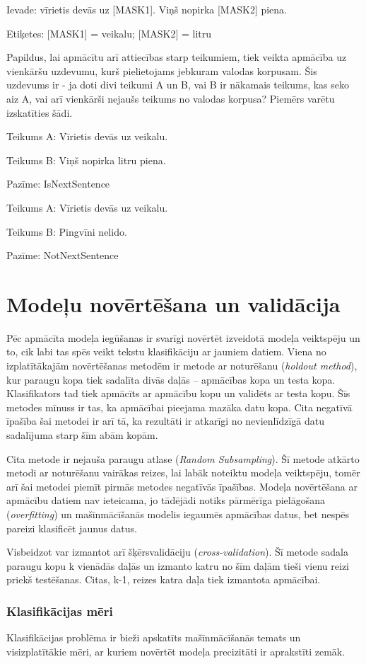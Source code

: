 Ievade: vīrietis devās uz [MASK1]. Viņš nopirka [MASK2] piena.

Etiķetes: [MASK1] = veikalu; [MASK2] = litru

Papildus, lai apmācītu arī attiecības starp teikumiem, tiek veikta apmācība uz vienkāršu uzdevumu, kurš pielietojams jebkuram valodas korpusam. Šis uzdevums ir - ja doti divi teikumi A un B, vai B ir nākamais teikums, kas seko aiz A, vai arī vienkārši nejaušs teikums no valodas korpusa? Piemērs varētu izskatīties šādi.

Teikums A: Vīrietis devās uz veikalu.

Teikums B: Viņš nopirka litru piena.

Pazīme: IsNextSentence

Teikums A: Vīrietis devās uz veikalu.

Teikums B: Pingvīni nelido.

Pazīme: NotNextSentence

\pagebreak
\section{Modeļu novērtēšana un validācija}
Pēc apmācīta modeļa iegūšanas ir svarīgi novērtēt izveidotā modeļa veiktspēju un to, cik labi tas spēs veikt tekstu klasifikāciju ar jauniem datiem. 
Viena no izplatītākajām novērtēšanas metodēm ir metode ar noturēšanu (\textit{holdout method}), kur paraugu kopa tiek sadalīta divās daļās – apmācības kopa un testa kopa. Klasifikators tad tiek apmācīts ar apmācību kopu un validēts ar testa kopu. Šīs metodes mīnuss ir tas, ka apmācībai pieejama mazāka datu kopa. Cita negatīvā īpašība šai metodei ir arī tā, ka rezultāti ir atkarīgi no nevienlīdzīgā datu sadalījuma starp šīm abām kopām.

Cita metode ir nejauša paraugu atlase (\textit{Random Subsampling}). Šī metode atkārto metodi ar noturēšanu vairākas reizes, lai labāk noteiktu modeļa veiktspēju, tomēr arī šai metodei piemīt pirmās metodes negatīvās īpašības.
Modeļa novērtēšana ar apmācību datiem nav ieteicama, jo tādējādi notiks pārmērīga pielāgošana (\textit{overfitting}) un mašīnmācīšanās modelis iegaumēs apmācības datus, bet nespēs pareizi klasificēt jaunus datus.

Visbeidzot var izmantot arī šķērsvalidāciju (\textit{cross-validation}). Šī metode sadala paraugu kopu k vienādās daļās un izmanto katru no šīm daļām tieši vienu reizi priekš testēšanas.  Citas, k-1, reizes katra daļa tiek izmantota apmācībai.

\subsubsection{Klasifikācijas mēri}
\renewcommand{\theequation}{2.\arabic{equation}}
Klasifikācijas problēma ir bieži apskatīts mašīnmācīšanās temats un visizplatītākie mēri, ar kuriem novērtēt modeļa precizitāti ir aprakstīti zemāk.

